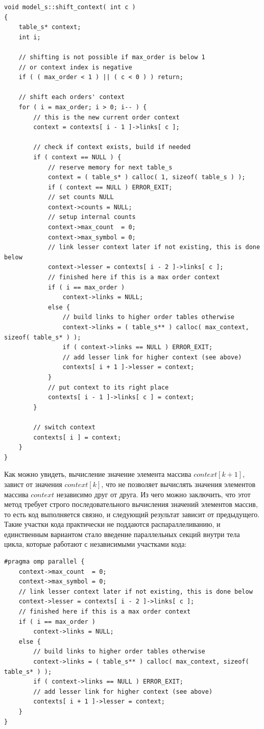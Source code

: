 \documentclass{matmex-diploma-custom}
\begin{document}
\begin{lstlisting}
void model_s::shift_context( int c )
{
    table_s* context;
    int i;

    // shifting is not possible if max_order is below 1
    // or context index is negative
    if ( ( max_order < 1 ) || ( c < 0 ) ) return;

    // shift each orders' context
    for ( i = max_order; i > 0; i-- ) {
        // this is the new current order context
        context = contexts[ i - 1 ]->links[ c ];

        // check if context exists, build if needed
        if ( context == NULL ) {
            // reserve memory for next table_s
            context = ( table_s* ) calloc( 1, sizeof( table_s ) );
            if ( context == NULL ) ERROR_EXIT;
            // set counts NULL
            context->counts = NULL;
            // setup internal counts
            context->max_count  = 0;
            context->max_symbol = 0;
            // link lesser context later if not existing, this is done below
            context->lesser = contexts[ i - 2 ]->links[ c ];
            // finished here if this is a max order context
            if ( i == max_order )
                context->links = NULL;
            else {
                // build links to higher order tables otherwise
                context->links = ( table_s** ) calloc( max_context, sizeof( table_s* ) );
                if ( context->links == NULL ) ERROR_EXIT;
                // add lesser link for higher context (see above)
                contexts[ i + 1 ]->lesser = context;
            }
            // put context to its right place
            contexts[ i - 1 ]->links[ c ] = context;
        }

        // switch context
        contexts[ i ] = context;
    }
}
\end{lstlisting}

Как можно увидеть, вычисление значение элемента массива $context[k+1]$, завист от значения $context[k]$, что не позволяет вычислять значения элементов массива $context$ независимо друг от друга. Из чего можно заключить, что этот метод требует строго последовательного вычисления значений элементов массив, то есть код выполняется связно, и следующий результат зависит от предыдущего. Такие участки кода практически не поддаются распараллеливанию, и единственным вариантом стало введение параллельных секций внутри тела цикла, которые работают с независимыми участками кода:

\begin{lstlisting}
#pragma omp parallel {
    context->max_count  = 0;
    context->max_symbol = 0;
    // link lesser context later if not existing, this is done below
    context->lesser = contexts[ i - 2 ]->links[ c ];
    // finished here if this is a max order context
    if ( i == max_order )
        context->links = NULL;
    else {
        // build links to higher order tables otherwise
        context->links = ( table_s** ) calloc( max_context, sizeof( table_s* ) );
        if ( context->links == NULL ) ERROR_EXIT;
        // add lesser link for higher context (see above)
        contexts[ i + 1 ]->lesser = context;
    }
}
\end{lstlisting}
\end{document}

